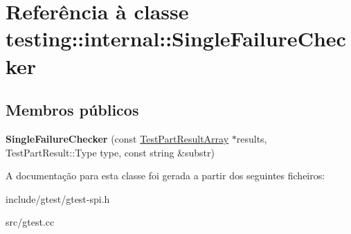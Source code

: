 \hypertarget{classtesting_1_1internal_1_1SingleFailureChecker}{\section{Referência à classe testing\-:\-:internal\-:\-:Single\-Failure\-Checker}
\label{classtesting_1_1internal_1_1SingleFailureChecker}
}
\subsection*{Membros públicos}
\begin{DoxyCompactItemize}
\item 
\hypertarget{classtesting_1_1internal_1_1SingleFailureChecker_a6d350d385526c97c9982e928f5f8fb56}{{\bfseries Single\-Failure\-Checker} (const \hyperlink{classtesting_1_1TestPartResultArray}{Test\-Part\-Result\-Array} $\ast$results, Test\-Part\-Result\-::\-Type type, const string \&substr)}\label{classtesting_1_1internal_1_1SingleFailureChecker_a6d350d385526c97c9982e928f5f8fb56}

\end{DoxyCompactItemize}


A documentação para esta classe foi gerada a partir dos seguintes ficheiros\-:\begin{DoxyCompactItemize}
\item 
include/gtest/gtest-\/spi.\-h\item 
src/gtest.\-cc\end{DoxyCompactItemize}
